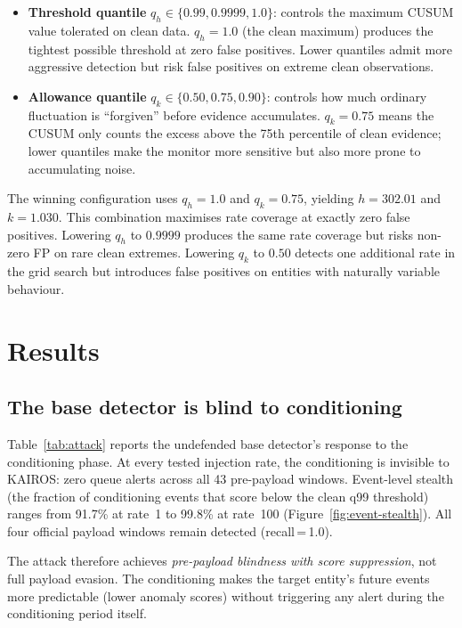 \documentclass[10pt,twocolumn]{article}
\begin{document}
\begin{itemize}
  \item \textbf{Threshold quantile} $q_h \in \{0.99, 0.9999, 1.0\}$:
    controls the maximum CUSUM value tolerated on clean data.  $q_h = 1.0$
    (the clean maximum) produces the tightest possible threshold at zero
    false positives.  Lower quantiles admit more aggressive detection but
    risk false positives on extreme clean observations.
  \item \textbf{Allowance quantile} $q_k \in \{0.50, 0.75, 0.90\}$:
    controls how much ordinary fluctuation is ``forgiven'' before evidence
    accumulates.  $q_k = 0.75$ means the CUSUM only counts the excess
    above the 75th percentile of clean evidence; lower quantiles make the
    monitor more sensitive but also more prone to accumulating noise.
\end{itemize}

The winning configuration uses $q_h = 1.0$ and $q_k = 0.75$, yielding
$h = 302.01$ and $k = 1.030$.  This combination maximises rate coverage
at exactly zero false positives.  Lowering $q_h$ to $0.9999$ produces
the same rate coverage but risks non-zero FP on rare clean extremes.
Lowering $q_k$ to $0.50$ detects one additional rate in the grid search
but introduces false positives on entities with naturally variable
behaviour.


\section{Results}
\label{sec:results}

\subsection{The base detector is blind to conditioning}

Table~\ref{tab:attack} reports the undefended base detector's response to
the conditioning phase.  At every tested injection rate, the conditioning
is invisible to KAIROS: zero queue alerts across all 43 pre-payload windows.
Event-level stealth (the fraction of conditioning events that score below
the clean q99 threshold) ranges from 91.7\% at rate~1 to 99.8\% at
rate~100 (Figure~\ref{fig:event-stealth}).  All four official payload
windows remain detected (recall\,=\,1.0).

The attack therefore achieves \emph{pre-payload blindness with score
suppression}, not full payload evasion.  The conditioning makes the target
entity's future events more predictable (lower anomaly scores) without
triggering any alert during the conditioning period itself.
\end{document}
